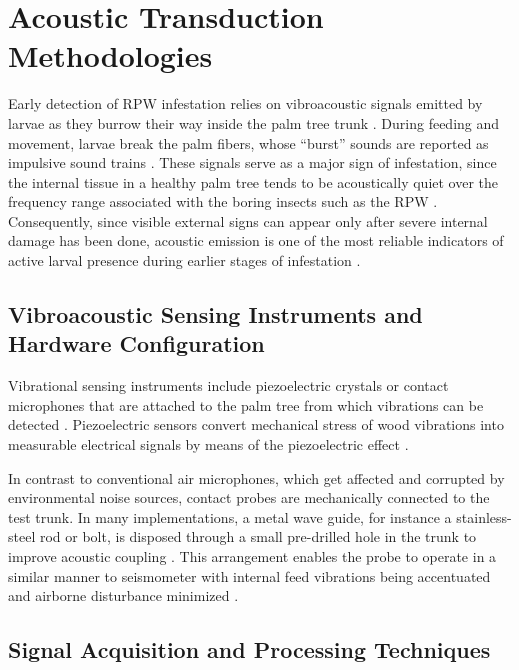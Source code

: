 \documentclass[12pt,a4paper,oneside]{memoir}
\begin{document}

\section{Acoustic Transduction Methodologies}
\label{sec:GRP-I}

Early detection of RPW infestation relies on vibroacoustic signals emitted by larvae as they burrow their way inside the palm tree trunk \cite{pinhas2008,karar2021}. During feeding and movement, larvae break the palm fibers, whose ``burst'' sounds are reported as impulsive sound trains \cite{pinhas2008,karar2021}. These signals serve as a major sign of infestation, since the internal tissue in a healthy palm tree tends to be acoustically quiet over the frequency range associated with the boring insects such as the RPW \cite{karar2021,sutanto2023}. Consequently, since visible external signs can appear only after severe internal damage has been done, acoustic emission is one of the most reliable indicators of active larval presence during earlier stages of infestation \cite{saleem2022,sutanto2023}.

\subsection{Vibroacoustic Sensing Instruments and Hardware Configuration}

Vibrational sensing instruments include piezoelectric crystals or contact microphones that are attached to the palm tree from which vibrations can be detected \cite{pinhas2008,karar2021}. Piezoelectric sensors convert mechanical stress of wood vibrations into measurable electrical signals by means of the piezoelectric effect \cite{karar2021,saranya2025}.

In contrast to conventional air microphones, which get affected and corrupted by environmental noise sources, contact probes are mechanically connected to the test trunk. In many implementations, a metal wave guide, for instance a stainless-steel rod or bolt, is disposed through a small pre-drilled hole in the trunk to improve acoustic coupling \cite{karar2021}. This arrangement enables the probe to operate in a similar manner to seismometer with internal feed vibrations being accentuated and airborne disturbance minimized \cite{karar2021,sutanto2023}.

\subsection{Signal Acquisition and Processing Techniques}
\end{document}
